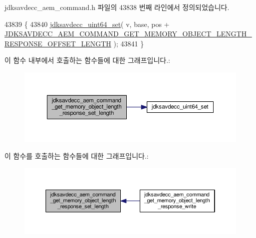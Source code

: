 jdksavdecc\+\_\+aem\+\_\+command.\+h 파일의 43838 번째 라인에서 정의되었습니다.


\begin{DoxyCode}
43839 \{
43840     \hyperlink{group__endian_ga48c6225616d8c003861be5c423a36631}{jdksavdecc\_uint64\_set}( v, base, pos + 
      \hyperlink{group__command__get__memory__object__length__response_gaf0246e10c76855d11d273c495ea83377}{JDKSAVDECC\_AEM\_COMMAND\_GET\_MEMORY\_OBJECT\_LENGTH\_RESPONSE\_OFFSET\_LENGTH}
       );
43841 \}
\end{DoxyCode}


이 함수 내부에서 호출하는 함수들에 대한 그래프입니다.\+:
\nopagebreak
\begin{figure}[H]
\begin{center}
\leavevmode
\includegraphics[width=350pt]{group__command__aem__get__memory__object__length__response_ga5fa97036296f708bd1b47cd1babc5d5b_cgraph}
\end{center}
\end{figure}




이 함수를 호출하는 함수들에 대한 그래프입니다.\+:
\nopagebreak
\begin{figure}[H]
\begin{center}
\leavevmode
\includegraphics[width=350pt]{group__command__aem__get__memory__object__length__response_ga5fa97036296f708bd1b47cd1babc5d5b_icgraph}
\end{center}
\end{figure}


